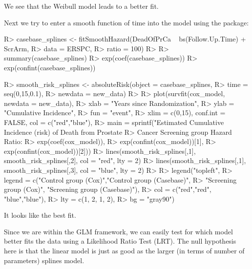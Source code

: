 \documentclass[
]{jss}
\begin{document}
We see that the Weibull model leads to a better fit.

Next we try to enter a smooth function of time into the model using the
 package:

\begin{CodeChunk}

\begin{CodeInput}
R> casebase_splines <- fitSmoothHazard(DeadOfPrCa ~ bs(Follow.Up.Time) + ScrArm, 
R>                                     data = ERSPC, 
R>                                     ratio = 100)
R> 
R> summary(casebase_splines)
R> exp(coef(casebase_splines))
R> exp(confint(casebase_splines))
\end{CodeInput}
\end{CodeChunk}

\begin{CodeChunk}

\begin{CodeInput}
R> smooth_risk_splines <- absoluteRisk(object = casebase_splines, 
R>                                     time = seq(0,15,0.1), 
R>                                     newdata = new_data)
R> 
R> plot(survfit(cox_model, newdata = new_data),
R>      xlab = "Years since Randomization", 
R>      ylab = "Cumulative Incidence", 
R>      fun = "event",
R>      xlim = c(0,15), conf.int = FALSE, col = c("red","blue"), 
R>      main = sprintf("Estimated Cumulative Incidence (risk) of Death from Prostate 
R>                     Cancer Screening group Hazard Ratio: %
R>                     exp(coef(cox_model)), 
R>                     exp(confint(cox_model))[1], 
R>                     exp(confint(cox_model))[2]))
R> lines(smooth_risk_splines[,1], smooth_risk_splines[,2], col = "red", lty = 2)
R> lines(smooth_risk_splines[,1], smooth_risk_splines[,3], col = "blue", lty = 2)
R> 
R> legend("topleft", 
R>        legend = c("Control group (Cox)","Control group (Casebase)",
R>                   "Screening group (Cox)", "Screening group (Casebase)"), 
R>        col = c("red","red", "blue","blue"),
R>        lty = c(1, 2, 1, 2), 
R>        bg = "gray90")
\end{CodeInput}
\end{CodeChunk}

It looks like the best fit.

Since we are within the GLM framework, we can easily test for which
model better fits the data using a Likelihood Ratio Test (LRT). The null
hypothesis here is that the linear model is just as good as the larger
(in terms of number of parameters) splines model.
\end{document}
